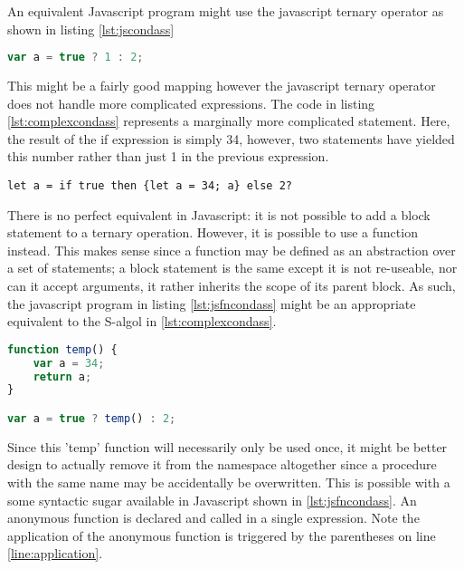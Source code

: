 \documentclass{article}
\begin{document}
An equivalent Javascript program might use the javascript ternary operator as shown in listing \ref{lst:jscondass}

\begin{lstlisting}[caption={Javascript conditional assignment},label={lst:jscondass}, language=javascript]
var a = true ? 1 : 2;
\end{lstlisting}

This might be a fairly good mapping however the javascript ternary operator does not handle more complicated expressions. The code in listing \ref{lst:complexcondass} represents a marginally more complicated statement. Here, the result of the if expression is simply 34, however, two statements have yielded this number rather than just 1 in the previous expression.

\begin{lstlisting}[caption={More complicated S-Algol conditional assignment},label={lst:complexcondass}]
let a = if true then {let a = 34; a} else 2?
\end{lstlisting}

There is no perfect equivalent in Javascript: it is not possible to add a block statement to a ternary operation. However, it is possible to use a function instead. This makes sense since a function may be defined as an abstraction over a set of statements; a block statement is the same except it is not re-useable, nor can it accept arguments, it rather inherits the scope of its parent block. As such, the javascript program in listing \ref{lst:jsfncondass} might be an appropriate equivalent to the S-algol in \ref{lst:complexcondass}.

\begin{lstlisting}[caption={Javascript conditional assignment using a function},label={lst:jsfncondass}, language=javascript]
function temp() {
    var a = 34;
    return a;
}

var a = true ? temp() : 2;
\end{lstlisting}

Since this 'temp' function will necessarily only be used once, it might be better design to actually remove it from the namespace altogether since a procedure with the same name may be accidentally be overwritten. This is possible with a some syntactic sugar available in Javascript shown in \ref{lst:jsfncondass}. An anonymous function is declared and called in a single expression. Note the application of the anonymous function is triggered by the parentheses on line \ref{line:application}.
\end{document}
